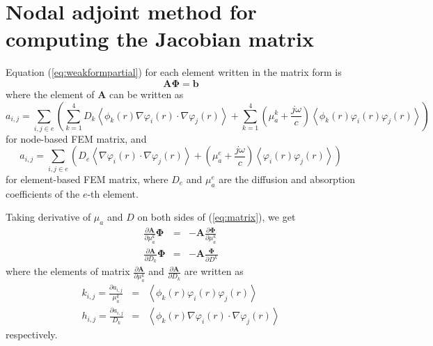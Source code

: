 \documentclass{article}
\begin{document}
\section{Nodal adjoint method for computing the Jacobian matrix}
Equation (\ref{eq:weakformpartial}) for each element written in the
matrix form is
\begin{equation}
\label{eq:matrix} \mathbf{A}{\boldsymbol\Phi}=\mathbf{b}
\end{equation}
where the element of $\mathbf{A}$ can be written as
\begin{equation}
a_{i,j}=\sum_{i,j\in e}\left(\sum_{k=1}^4D_k\left\langle
\phi_k(r)\nabla\varphi_i(r)\cdot\nabla\varphi_j(r)\right\rangle+\sum_{k=1}^4\left(\mu_{a}^k+\frac{j\omega}{c}\right)\left\langle\phi_k(r)\varphi_i(r)\varphi_j(r)\right\rangle\right)
\end{equation}
for node-based FEM matrix, and 
\begin{equation}
a_{i,j}=\sum_{i,j\in e}\left(D_e\left\langle
\nabla\varphi_i(r)\cdot\nabla\varphi_j(r)\right\rangle+\left(\mu_{a}^{e}+\frac{j\omega}{c}\right)\left\langle\varphi_i(r)\varphi_j(r)\right\rangle\right)
\end{equation}
for element-based FEM matrix, where $D_e$ and $\mu_a^{e}$ are the diffusion and absorption coefficients 
of the $e$-th element.

Taking derivative of $\mu_a$ and $D$ on both sides of
(\ref{eq:matrix}), we get
\begin{eqnarray}
\frac{\partial \mathbf{A}}{\partial
\mu_a^k}{\boldsymbol\Phi}&=&-\mathbf{A}\frac{\partial {\boldsymbol\Phi}}{\partial \mu_a^k}\\
\frac{\partial \mathbf{A}}{\partial
D_k}{\boldsymbol\Phi}&=&-\mathbf{A}\frac{\boldsymbol\Phi}{\partial
D^k}
\end{eqnarray}
where the elements of matrix $\frac{\partial \mathbf{A}}{\partial
\mu_a^k}$ and $\frac{\partial \mathbf{A}}{\partial D_k}$ are
written as
\begin{eqnarray}
k_{i,j}=\frac{\partial
a_{i,j}}{\mu_a^k}&=&\left\langle\phi_k(r)\varphi_i(r)\varphi_j(r)\right\rangle\\
h_{i,j}=\frac{\partial a_{i,j}}{D_k}&=&\left\langle
\phi_k(r)\nabla\varphi_i(r)\cdot\nabla\varphi_j(r)\right\rangle
\end{eqnarray}
respectively.
\end{document}
